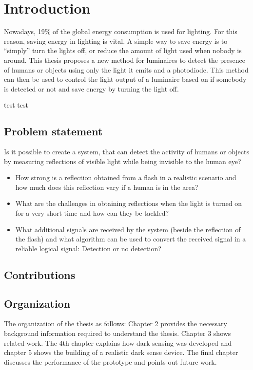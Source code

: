 \chapter{Introduction}
\label{chp:introduction}
Nowadays, 19\% of the global energy consumption is used for lighting. For this reason, saving energy in lighting is vital. A simple way to save energy is to “simply” turn the lights off, or reduce the amount of light used when nobody is around. This thesis proposes a new method for luminaires to detect the presence of humans or objects using only the light it emits and a photodiode. This method can then be used to control the light output of a luminaire based on if somebody is detected or not and save energy by turning the light off.

test test

\section{Problem statement}
\label{Problem statement}
Is it possible to create a system, that can detect the activity of humans or objects by measuring reflections of visible light while being invisible to the human eye?
\begin{itemize}\itemsep2pt
	\item How strong is a reflection obtained from a flash in a realistic scenario and how much does this reflection vary if a human is in the area?
	\item What are the challenges in obtaining reflections when the light is turned on for a very short time and how can they be tackled?
	\item What additional signals are received by the system (beside the reflection of the flash) and what algorithm can be used to convert the received signal in a reliable logical signal: Detection or no detection?
\end{itemize}
\section{Contributions}
\label{sec:Contributions}

\section{Organization}
\label{sec:Organization}
The organization of the thesis as follows: Chapter 2 provides the necessary background information required to understand the thesis. Chapter 3 shows related work. The 4th chapter explains how dark sensing was developed and chapter 5 shows the building of a realistic dark sense device. The final chapter discusses the performance of the prototype and points out future work.